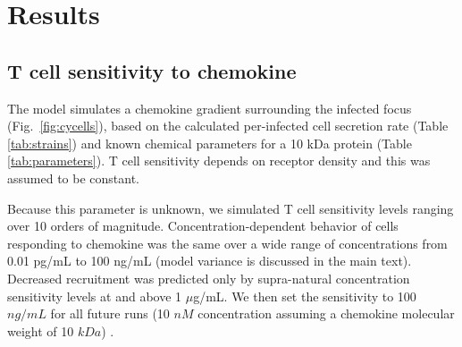 \documentclass[preprint,10pt,authoryear]{article}
\newcommand{\removed}[1]{{\color{dkred}\sout{#1}}}
\newcommand{\fred}[1]{{\color{dkblue}#1}}
\begin{document}
%


\section{Results}


\subsection{T cell sensitivity to chemokine}

The model simulates a chemokine gradient surrounding the infected focus (Fig.~\ref{fig:cycells}), based on the calculated per-infected cell secretion rate (Table \ref{tab:strains}) and known chemical parameters for a 10 kDa protein (Table \ref{tab:parameters}).  T cell sensitivity depends on receptor density \citep{Desmetz2006} and this was assumed to be constant.

Because this parameter is unknown, we simulated T cell sensitivity levels ranging over 10 orders of magnitude.  Concentration-dependent behavior of cells responding to chemokine was the same over a wide range of concentrations from 0.01 pg/mL to 100 ng/mL (model variance is discussed in the main text).  Decreased recruitment was predicted only by supra-natural concentration sensitivity levels at and above 1 $\mu$g/mL.  We then set the sensitivity to 100 $ng/mL$ for all future runs (10 $nM$ concentration assuming a chemokine molecular weight of 10 $kDa$) \citep{Gao2003}.  
\end{document}
